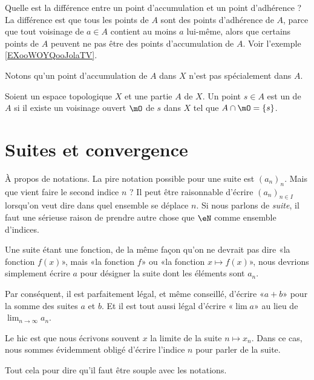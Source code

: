 Quelle est la différence entre un point d'accumulation et un point d'adhérence ? La différence est que tous les points de \( A\) sont des points d'adhérence de \( A\), parce que tout voisinage de \( a\in A\) contient au moins \( a\) lui-même, alors que certains points de \( A\) peuvent ne pas être des points d'accumulation de \( A\). Voir l'exemple \ref{EXooWOYQooJolaTV}.

Notons qu'un point d'accumulation de \( A\) dans \( X\) n'est pas spécialement dans \( A\).

\begin{definition}      \label{DEFooXIOWooWUKJhN}
    Soient un espace topologique \( X\) et une partie \( A\) de \( X\). Un point \( s\in A \) est un  de \( A\) si il existe un voisinage ouvert \( \mO\) de \( s\) dans \( X\) tel que \( A\cap\mO=\{ s \}\).
\end{definition}

\section{Suites et convergence}

\begin{normaltext}
    À propos de notations. La pire notation possible pour une suite est \( (a_n)_n\). Mais que vient faire le second indice \( n\) ? Il peut être raisonnable d'écrire \( (a_n)_{n\in I}\) lorsqu'on veut dire dans quel ensemble se déplace \( n\). Si nous parlons de \emph{suite}, il faut une sérieuse raison de prendre autre chose que \( \eN\) comme ensemble d'indices.

    Une suite étant une fonction, de la même façon qu'on ne devrait pas dire «la fonction \( f(x)\)», mais «la fonction \( f\)» ou «la fonction \( x\mapsto f(x)\)», nous devrions simplement écrire \( a\) pour désigner la suite dont les éléments sont \( a_n\). 

    Par conséquent, il est parfaitement légal, et même conseillé, d'écrire «\( a+b\)» pour la somme des suites \( a\) et \( b\). Et il est tout aussi légal d'écrire «\( \lim a\)» au lieu de \( \lim_{n\to \infty} a_n\).

    Le hic est que nous écrivons souvent \( x\) la limite de la suite \( n\mapsto x_n\). Dans ce cas, nous sommes évidemment obligé d'écrire l'indice \( n\) pour parler de la suite.

    Tout cela pour dire qu'il faut être souple avec les notations.
\end{normaltext}

